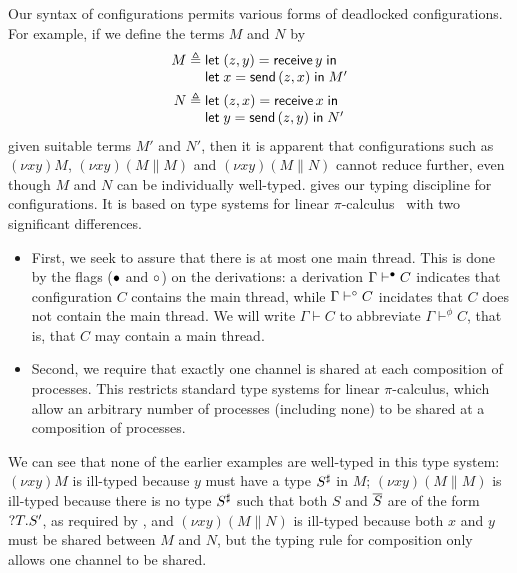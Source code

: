 \documentclass[oribibl,orivec,envcountsame]{llncs}
\begin{document}
Our syntax of configurations permits various forms of deadlocked configurations.  For example, if we
define the terms $M$ and $N$ by
\begin{align*}
  M &\defeq \bl
    \gvlet{(z,y)}{\gvreceive{y}}{} \\
    \gvlet{x}{\gvsend{(z,x)}}{M'} \el \\
  N &\defeq \bl
    \gvlet{(z,x)}{\gvreceive{x}}{} \\
    \gvlet{y}{\gvsend{(z,y)}}{N'} \el
\end{align*}
given suitable terms $M'$ and $N'$, then it is apparent that configurations such as $(\nu xy)M$,
$(\nu xy)(M \parallel M)$ and $(\nu xy)(M \parallel N)$ cannot reduce further, even though $M$ and
$N$ can be individually well-typed.   gives our typing discipline for
configurations.  It is based on type systems for linear $\pi$-calculus~\cite{Kobayashi96} with two
significant differences.
\begin{itemize}
\item First, we seek to assure that there is at most one main thread.  This is done by the flags
  (${\mathord{\bullet}}$ and ${\mathord{\circ}}$) on the derivations: a derivation $\Gamma \vdash^{\mathord{\bullet}} C$ indicates that
  configuration $C$ contains the main thread, while $\Gamma \vdash^{\mathord{\circ}} C$ incidates that $C$ does
  not contain the main thread.  We will write $\Gamma \vdash C$ to abbreviate $\Gamma \vdash^\phi
  C$, that is, that $C$ may contain a main thread.
\item Second, we require that exactly one channel is shared at each composition of processes.  This
  restricts standard type systems for linear $\pi$-calculus, which allow an arbitrary number of
  processes (including none) to be shared at a composition of processes.
\end{itemize}
We can see that none of the earlier examples are well-typed in this type system: $(\nu xy)M$ is
ill-typed because $y$ must have a type $S^\sharp$ in $M$; $(\nu xy)(M \parallel M)$ is ill-typed
because there is no type $S^\sharp$ such that both $S$ and $\overline{S}$ are of the form
${?T.S'}$, as required by , and $(\nu xy)(M \parallel N)$ is ill-typed because
both $x$ and $y$ must be shared between $M$ and $N$, but the typing rule for composition only allows
one channel to be shared.
\end{document}
